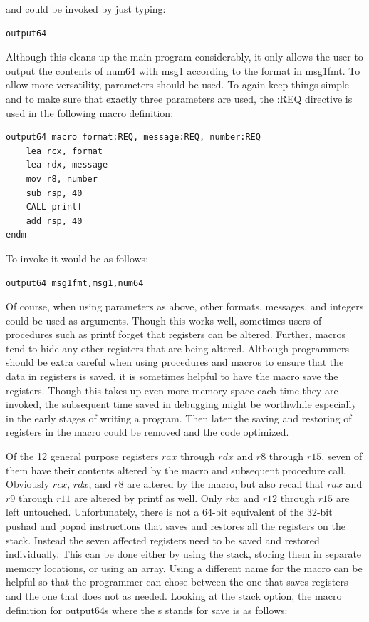 \documentclass[10pt]{book}
\begin{document}
and could be invoked by just typing:

\begin{verbatim}
output64
\end{verbatim}

Although this cleans up the main program considerably, it only allows the user to output the contents of num64 with msg1 according to the format in msg1fmt. To allow more versatility, parameters should be used. To again keep things simple and to make sure that exactly three parameters are used, the :REQ directive is used in the following macro definition:

\begin{verbatim}
output64 macro format:REQ, message:REQ, number:REQ
    lea rcx, format
    lea rdx, message
    mov r8, number
    sub rsp, 40
    CALL printf
    add rsp, 40
endm
\end{verbatim}

To invoke it would be as follows:

\begin{verbatim}
output64 msg1fmt,msg1,num64
\end{verbatim}

Of course, when using parameters as above, other formats, messages, and integers could be used as arguments. Though this works well, sometimes users of procedures such as printf forget that registers can be altered. Further, macros tend to hide any other registers that are being altered. Although programmers should be extra careful when using procedures and macros to ensure that the data in registers is saved, it is sometimes helpful to have the macro save the registers. Though this takes up even more memory space each time they are invoked, the subsequent time saved in debugging might be worthwhile especially in the early stages of writing a program. Then later the saving and restoring of registers in the macro could be removed and the code optimized.

Of the 12 general purpose registers $rax$ through $rdx$ and $r8$ through $r15$, seven of them have their contents altered by the macro and subsequent procedure call. Obviously $rcx$, $rdx$, and $r8$ are altered by the macro, but also recall that $rax$ and $r9$ through $r11$ are altered by printf as well. Only $rbx$ and $r12$ through $r15$ are left untouched. Unfortunately, there is not a 64-bit equivalent of the 32-bit pushad and popad instructions that saves and restores all the registers on the stack. Instead the seven affected registers need to be saved and restored individually. This can be done either by using the stack, storing them in separate memory locations, or using an array. Using a different name for the macro can be helpful so that the programmer can chose between the one that saves registers and the one that does not as needed. Looking at the stack option, the macro definition for output64s where the s stands for save is as follows:
\end{document}
